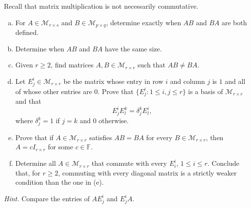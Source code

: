 \begin{exercise}
  \label{ex:hw02:matrix-commutation}
  Recall that matrix multiplication is not necessarily commutative.
  \begin{enumerate}[(a)][2]
    \item For \(A\in\mathcal M_{r\times s}\) and
      \(B\in\mathcal M_{p\times q}\), determine exactly when \(AB\)
      and \(BA\) are both defined.
    \item Determine when \(AB\) and \(BA\) have the same size.
    \item Given \(r\ge2\), find matrices \(A,B\in\mathcal M_{r\times r}\)
      such that \(AB\ne BA\).
    \item Let \(E^i_j\in\mathcal M_{r\times r}\) be the matrix whose
      entry in row \(i\) and column \(j\) is \(1\) and all of whose
      other entries are \(0\). Prove that
      \(\{E^i_j:1\le i,j\le r\}\) is a basis of
      \(\mathcal M_{r\times r}\) and that
      \[
        E^i_jE^k_l=\delta^k_jE^i_l,
      \]
      where \(\delta^k_j=1\) if \(j=k\) and \(0\) otherwise.
    \item Prove that if \(A\in\mathcal M_{r\times r}\) satisfies
      \(AB=BA\) for every \(B\in\mathcal M_{r\times r}\), then
      \(A=cI_{r\times r}\) for some \(c\in\mathbb F\).
    \item Determine all \(A\in\mathcal M_{r\times r}\) that commute
      with every \(E^i_i\), \(1\le i\le r\). Conclude that, for
      \(r\ge2\), commuting with every diagonal matrix is a strictly
      weaker condition than the one in (e).

  \end{enumerate}
  \emph{Hint.} Compare the entries of \(AE^i_j\) and \(E^i_jA\).
\end{exercise}
